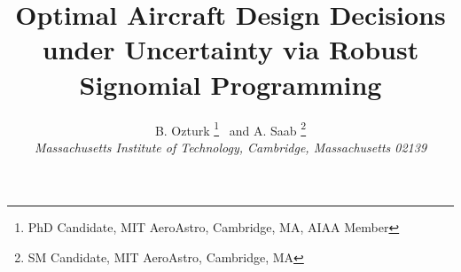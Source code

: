  \title{Optimal Aircraft Design Decisions under Uncertainty via Robust Signomial Programming}

 \author{
  B. Ozturk%
    \thanks{PhD Candidate, MIT AeroAstro, Cambridge, MA, AIAA Member}
  \ and A. Saab
     \thanks{SM Candidate, MIT AeroAstro, Cambridge, MA}
\\
  {\normalsize\itshape
   Massachusetts Institute of Technology, Cambridge, Massachusetts 02139}\\
 }


 \newcommand{\eqnref}[1]{(\ref{#1})}
 \newcommand{\class}[1]{\texttt{#1}}
 \newcommand{\package}[1]{\texttt{#1}}
 \newcommand{\file}[1]{\texttt{#1}}
 \newcommand{\BibTeX}{\textsc{Bib}\TeX}

\renewcommand{\vec}{\mathbf}
\newcommand{\mat}{\mathbf}

\usepackage[utf8]{inputenc}
\usepackage{algorithm}
\usepackage{bbm}
\usepackage{amsmath}
\usepackage{amsthm}
\usepackage{amssymb}
\usepackage{multicol}
\usepackage{tabularx}
\usepackage[toc,page]{appendix}
\usepackage{verbatim}
\usepackage{tikz}
\usepackage{tkz-kiviat}
\usetikzlibrary{arrows}
\usepackage{subcaption} 
\usepackage{graphicx}

 \newtheorem{theorem}{Theorem}[section]
 \newtheorem{corollary}{Corollary}[theorem]
 \newtheorem{lemma}[theorem]{Lemma}
 \newtheorem{proposition}[theorem]{Proposition}
